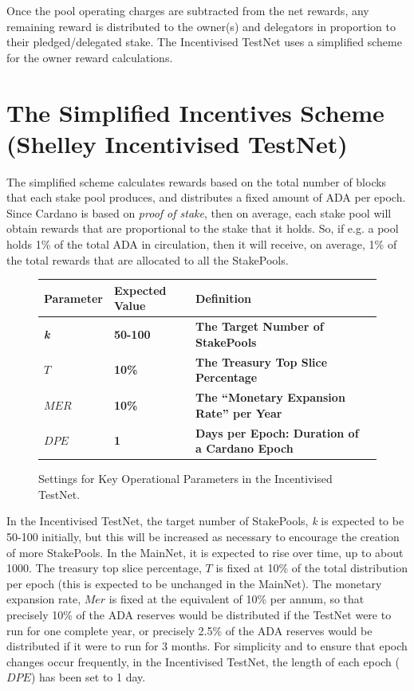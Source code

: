 \documentclass[11pt,a4paper,dvipsnames,twosided,final]{article}
\newcommand{\ada}{ADA{}}
\newcommand{\cardano}[1]{Cardano}
\begin{document}
Once the pool operating charges are subtracted from the net rewards, any remaining reward is distributed to the owner(s) and delegators
in proportion to their pledged/delegated stake.  The Incentivised TestNet uses a simplified scheme for the owner reward calculations.


\clearpage
\section{The Simplified Incentives Scheme (Shelley Incentivised TestNet)}
\label{sec:TestNet}

The simplified scheme calculates rewards based on the total number of blocks that each stake pool produces,
and distributes a fixed amount of \ada{} per epoch.
Since \cardano{} is based on \emph{proof of stake}, then on average, each stake pool will obtain
rewards that are proportional to the stake that it holds.  So, if e.g. a pool holds 1\% of the total
\ada{} in circulation, then it will receive, on average, 1\% of the total rewards that are allocated to all the
StakePools.

\begin{figure}[h!]
\begin{center}
\begin{tabular}{||l|l|p{10cm}|l||}
  \hline \hline
\textbf{Parameter} & \textbf{Expected Value} & \textbf{Definition} \\\hline
\textbf{\color{green} \emph{k}} & \textbf{\color{green} 50-100} &\textbf{\color{green}  The Target Number of StakePools} \\\hline
\textbf{\color{green} $T$} & \textbf{\color{green} 10\%} & \textbf{\color{green} The Treasury Top Slice Percentage} \\\hline
\textbf{\color{green} $\textit{MER}$} & \textbf{\color{green} 10\%}&  \textbf{\color{green} The ``Monetary Expansion Rate'' per Year}\\\hline
\textbf{\color{green} $\textit{DPE}$} & \textbf{\color{green} 1} & \textbf{\color{green}  Days per Epoch: Duration of a \cardano{} Epoch} \\\hline
  \hline
\end{tabular}
\end{center}
\caption{Settings for Key Operational Parameters in the Incentivised TestNet.}
\end{figure}

\noindent
In the Incentivised TestNet,
the target number of StakePools, \emph{k} is expected to be 50-100 initially, but this will be increased as necessary to encourage the creation of more StakePools.
In the MainNet, it is expected to rise over time, up to about 1000.
The treasury top slice percentage, $T$ is fixed at 10\% of the total distribution per epoch (this is expected to be unchanged in the MainNet).
The monetary expansion rate, $\textit{Mer}$ is fixed at the equivalent of 10\% per annum, so that precisely 10\% of the \ada{} reserves would be distributed
if the TestNet were to run for one complete year, or precisely 2.5\% of the \ada{} reserves would be distributed if it were to run for 3 months.
For simplicity and to ensure that epoch changes occur frequently, in the Incentivised TestNet, the length of each epoch ($\textit{DPE}$) has been set to 1 day.
\end{document}
